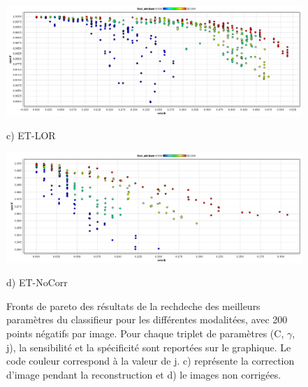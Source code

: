 \begin{figure}[h!]

\begin{center}
\includegraphics[width=14cm]{images/pareto_mod_LOR19.png}
 
{\small c) ET-LOR}
\vspace{0.5cm}

\includegraphics[width=14cm]{images/pareto_mod_NoCorr19.png}

{\small d) ET-NoCorr}

\end{center}
 \caption{\label{fig:paretoModalite19_2} Fronts de pareto des résultats de la rechdeche des meilleurs paramètres du classifieur pour les différentes modalitées, avec 200 points négatifs par image. Pour chaque triplet de paramètres (C, $\gamma$, j), la sensibilité et la spécificité sont reportées sur le graphique. Le code couleur correspond à la valeur de j. c) représente la correction d'image pendant la reconstruction et d) le images non corrigées.}
\end{figure}



